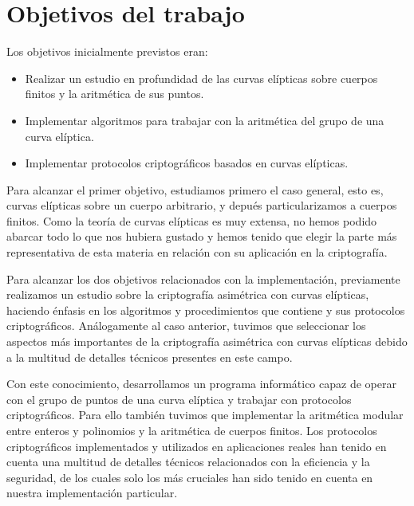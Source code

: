 \chapter{Objetivos del trabajo}
\label{ch:Objetivos del trabajo}



Los objetivos inicialmente previstos eran:
\begin{itemize}
    \item Realizar un estudio en profundidad de las curvas elípticas sobre cuerpos finitos y la aritmética de sus puntos.
    \item Implementar algoritmos para trabajar con la aritmética del grupo de una curva elíptica.
    \item Implementar protocolos criptográficos basados en curvas elípticas.
\end{itemize}

Para alcanzar el primer objetivo, estudiamos primero el caso general, esto es, curvas elípticas sobre un cuerpo arbitrario, y depués particularizamos a cuerpos finitos. Como la teoría de curvas elípticas es muy extensa, no hemos podido abarcar todo lo que nos hubiera gustado y hemos tenido que elegir la parte más representativa de esta materia en relación con su aplicación en la criptografía.

Para alcanzar los dos objetivos relacionados con la implementación, previamente realizamos un estudio sobre la criptografía asimétrica con curvas elípticas, haciendo énfasis en los algoritmos y procedimientos que contiene y sus protocolos criptográficos. Análogamente al caso anterior, tuvimos que seleccionar los aspectos más importantes de la criptografía asimétrica con curvas elípticas debido a la multitud de detalles técnicos presentes en este campo.

Con este conocimiento, desarrollamos un programa informático capaz de operar con el grupo de puntos de una curva elíptica y trabajar con protocolos criptográficos.
Para ello también tuvimos que implementar la aritmética modular entre enteros y polinomios y la aritmética de cuerpos finitos. Los protocolos criptográficos implementados y utilizados en aplicaciones reales han tenido en cuenta una multitud de detalles técnicos relacionados con la eficiencia y la seguridad, de los cuales solo los más cruciales han sido tenido en cuenta en nuestra implementación particular.

